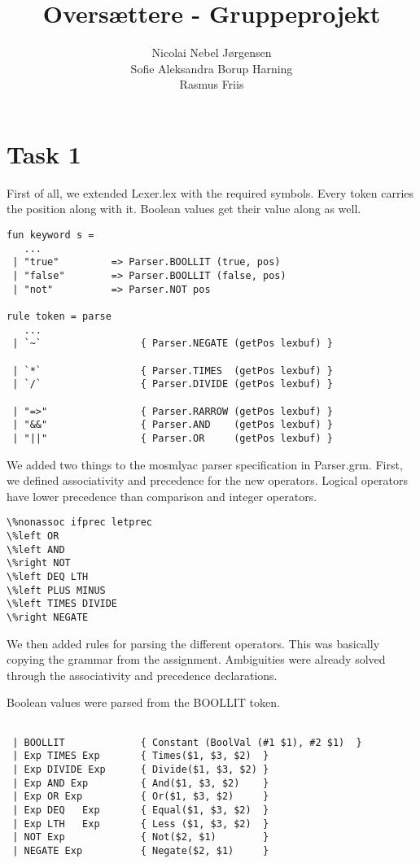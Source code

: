\documentclass[10pt]{article}
\begin{document}
\title{Oversættere - Gruppeprojekt}
\author{Nicolai Nebel Jørgensen\\
Sofie Aleksandra Borup Harning\\
Rasmus Friis}

\maketitle
\newpage
\section{Task 1}

First of all, we extended Lexer.lex with the required symbols. Every token carries the position along with it. Boolean values get their value along as well.

\begin{Verbatim}[frame=single]
fun keyword s =
   ...
 | "true"         => Parser.BOOLLIT (true, pos)
 | "false"        => Parser.BOOLLIT (false, pos)
 | "not"          => Parser.NOT pos

rule token = parse
   ...
 | `~`                 { Parser.NEGATE (getPos lexbuf) }

 | `*`                 { Parser.TIMES  (getPos lexbuf) }
 | `/`                 { Parser.DIVIDE (getPos lexbuf) }

 | "=>"                { Parser.RARROW (getPos lexbuf) }
 | "&&"                { Parser.AND    (getPos lexbuf) }
 | "||"                { Parser.OR     (getPos lexbuf) }
\end{Verbatim}

We added two things to the mosmlyac parser specification in Parser.grm. First, we defined associativity and precedence for the new operators. Logical operators have lower precedence than comparison and integer operators.

\begin{Verbatim}[frame=single]
\%nonassoc ifprec letprec
\%left OR
\%left AND
\%right NOT
\%left DEQ LTH
\%left PLUS MINUS
\%left TIMES DIVIDE
\%right NEGATE
\end{Verbatim}

We then added rules for parsing the different operators. This was basically copying the grammar from the assignment. Ambiguities were already solved through the associativity and precedence declarations.

Boolean values were parsed from the BOOLLIT token.

\begin{Verbatim}[frame=single]

 | BOOLLIT             { Constant (BoolVal (#1 $1), #2 $1)  }
 | Exp TIMES Exp       { Times($1, $3, $2)  }
 | Exp DIVIDE Exp      { Divide($1, $3, $2) }
 | Exp AND Exp         { And($1, $3, $2)    }
 | Exp OR Exp          { Or($1, $3, $2)     }
 | Exp DEQ   Exp       { Equal($1, $3, $2)  }
 | Exp LTH   Exp       { Less ($1, $3, $2)  }
 | NOT Exp             { Not($2, $1)        }
 | NEGATE Exp          { Negate($2, $1)     }
\end{Verbatim}
\end{document}
